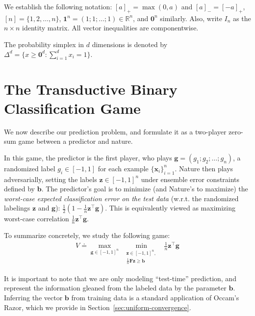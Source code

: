 \documentclass{colt2015} %
\newcommand{\vF}{\mathbf{F}}
\newcommand{\vx}{\mathbf{x}}
\newcommand{\vb}{\mathbf{b}}
\newcommand{\vg}{\mathbf{g}}
\newcommand{\vz}{\mathbf{z}}
\newcommand{\vzero}{\mathbf{0}}
\newcommand{\vone}{\mathbf{1}}
\newcommand{\RR}{\mathbb{R}}      %
\newcommand{\lrp}[1]{\left(#1\right)}
\begin{document}
We establish the following notation: $[a]_{+} = \max (0, a)$ and $[a]_{-} = [-a]_{+}$,  
$[n] = \{ 1,2,\dots,n \}$, $\vone^n = (1; 1; \dots; 1) \in \RR^n$, and $\vzero^n$
similarly.  Also, write $I_n$ as the $n \times n$ identity matrix.
All vector inequalities are componentwise. 

The probability simplex in $d$ dimensions is denoted by $\Delta^d = \{ x \geq \vzero^d : \sum_{i=1}^d x_i = 1 \}$.



\section{The Transductive Binary Classification Game}
\label{sec:game1}

We now describe our prediction problem, and formulate it as a
two-player zero-sum game between a predictor and nature.

In this game, the predictor is the first player, 
who plays $\vg = (g_1; g_2; \dots; g_n)$, 
a randomized label $g_i \in [-1,1]$ for each example $\{\vx_i\}_{i=1}^{n}$. 
Nature then plays adversarially, setting the labels $\vz \in [-1,1]^n$ 
under ensemble error constraints defined by $\vb$. 
The predictor's goal is to minimize (and Nature's to maximize) 
the \emph{worst-case expected classification error on the test data} 
(w.r.t. the randomized labelings $\vz$ and $\vg$): 
$\frac{1}{2} \lrp{1 - \frac{1}{n} \vz^\top \vg }$. 
This is equivalently viewed as maximizing worst-case correlation $\frac{1}{n} \vz^\top \vg $. 

To summarize concretely, we study the following game:
\begin{align}
\label{game1eq}
\displaystyle 
V\doteq\max_{\vg \in [-1,1]^n} \; \min_{\substack{ \vz \in [-1,1]^n , \\ \frac{1}{n} \vF \vz \geq \vb }} \;\; \frac{1}{n} \vz^\top \vg
\end{align}

It is important to note that we are only modeling ``test-time''
prediction, and represent the information gleaned from the labeled data
by the parameter $\vb$. Inferring the vector $\vb$ from training data
is a standard application of Occam's Razor, which we provide in
Section~\ref{sec:uniform-convergence}.
\end{document}
